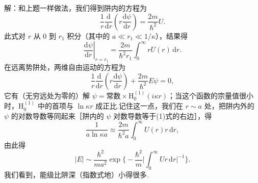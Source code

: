 \begin{xiti}
解：和上题一样做法，我们得到阱内的方程为
\begin{equation*}
  \frac{1}{r}\frac{\mathrm{d}}{\mathrm{d}r}\left(r\frac{\mathrm{d}\psi}{\mathrm{d}r}\right)
  =\frac{2m}{\hbar^2}U.
\end{equation*}
此式对 $r$ 从 0 到 $r_1$ 积分（其中的 $a\ll r_1\ll1/\kappa$），结果得
\setcounter{equation}{0}%
\begin{equation}
  \left.\frac{\mathrm{d}\psi}{\mathrm{d}r}\right|_{r=r_1}
  =\frac{2m}{\hbar^2r_1}\int_0^{\infty}rU(r)\,\mathrm{d}r.
\end{equation}
在远离势阱处，两维自由运动的方程为
\begin{equation*}
  \frac{1}{r}\frac{\mathrm{d}}{\mathrm{d}r}\left(r\frac{\mathrm{d}\psi}{\mathrm{d}r}\right)
  +\frac{2m}{\hbar^2}E\psi=0,
\end{equation*}
它有（无穷远处为零的）解 $\psi=\text{常数}\times\mathrm{H}_0^{(1)}(i\kappa r)$；当这个函数的宗量值很小时，$\mathrm{H}_0^{(1)}$ 中的首项与 $\ln\kappa r$ 成正比.记住这一点，我们在 $r\sim a$ 处，把阱内外的 $\psi$ 的对数导数等同起来［阱内的 $\psi$ 对数导数等于(1)式的右边］，得
\begin{equation*}
  \frac{1}{a\ln\kappa a}\approx\frac{2m}{\hbar^2a}\int_0^{\infty}U(r)r\,\mathrm{d}r,
\end{equation*}
由此得
\begin{equation*}
  |E|\sim\frac{\hbar^2}{ma^2}\exp\biggl\{
  -\frac{\hbar^2}{m}\biggl|\int_0^{\infty}Ur\,\mathrm{d}r\biggr|^{-1}\biggr\}.
\end{equation*}
我们看到，能级比阱深（指数式地）小得很多.

\end{xiti}
\renewcommand{\theequation}{\arabic{section}.\arabic{equation}}%
